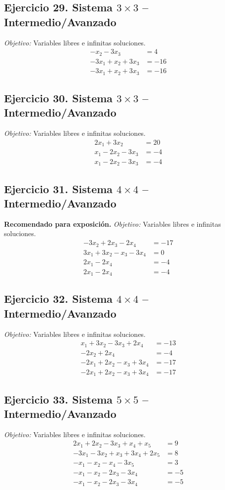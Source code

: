 \documentclass[12pt]{article}
\theoremstyle{remark}
\begin{document}
\subsection*{Ejercicio 29. Sistema $3\times3$ -- Intermedio/Avanzado}
\emph{Objetivo:} Variables libres e infinitas soluciones.
\[
\begin{aligned}
- x_{2} - 3 x_{3} &= 4\\
- 3 x_{1} + x_{2} + 3 x_{3} &= -16\\
- 3 x_{1} + x_{2} + 3 x_{3} &= -16
\end{aligned}
\]
\subsection*{Ejercicio 30. Sistema $3\times3$ -- Intermedio/Avanzado}
\emph{Objetivo:} Variables libres e infinitas soluciones.
\[
\begin{aligned}
2 x_{1} + 3 x_{2} &= 20\\
x_{1} - 2 x_{2} - 3 x_{3} &= -4\\
x_{1} - 2 x_{2} - 3 x_{3} &= -4
\end{aligned}
\]
\subsection*{Ejercicio 31. Sistema $4\times4$ -- Intermedio/Avanzado}
\textbf{Recomendado para exposición.} \emph{Objetivo:} Variables libres e infinitas soluciones.
\[
\begin{aligned}
- 3 x_{2} + 2 x_{3} - 2 x_{4} &= -17\\
3 x_{1} + 3 x_{2} - x_{3} - 3 x_{4} &= 0\\
2 x_{1} - 2 x_{4} &= -4\\
2 x_{1} - 2 x_{4} &= -4
\end{aligned}
\]
\subsection*{Ejercicio 32. Sistema $4\times4$ -- Intermedio/Avanzado}
\emph{Objetivo:} Variables libres e infinitas soluciones.
\[
\begin{aligned}
x_{1} + 3 x_{2} - 3 x_{3} + 2 x_{4} &= -13\\
- 2 x_{2} + 2 x_{4} &= -4\\
- 2 x_{1} + 2 x_{2} - x_{3} + 3 x_{4} &= -17\\
- 2 x_{1} + 2 x_{2} - x_{3} + 3 x_{4} &= -17
\end{aligned}
\]
\subsection*{Ejercicio 33. Sistema $5\times5$ -- Intermedio/Avanzado}
\emph{Objetivo:} Variables libres e infinitas soluciones.
\[
\begin{aligned}
2 x_{1} + 2 x_{2} - 3 x_{3} + x_{4} + x_{5} &= 9\\
- 3 x_{1} - 3 x_{2} + x_{3} + 3 x_{4} + 2 x_{5} &= 8\\
- x_{1} - x_{2} - x_{4} - 3 x_{5} &= 3\\
- x_{1} - x_{2} - 2 x_{3} - 3 x_{4} &= -5\\
- x_{1} - x_{2} - 2 x_{3} - 3 x_{4} &= -5
\end{aligned}
\]
\end{document}
